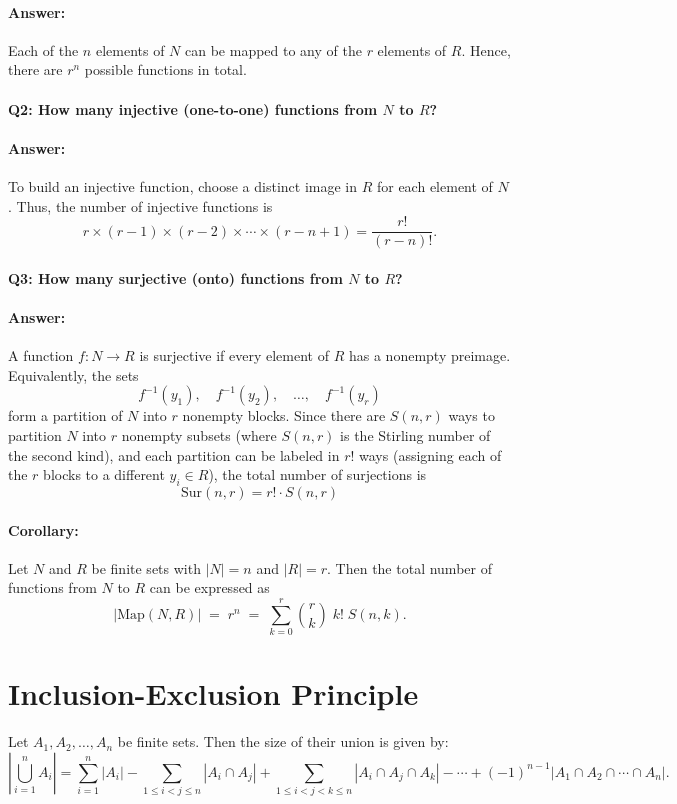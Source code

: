 \documentclass{article}
\begin{document}
\paragraph{Answer:} 
Each of the \(n\) elements of \(N\) can be mapped to any of the \(r\) elements of \(R\). Hence, there are \(r^n\) possible functions in total.

\paragraph{Q2: How many injective (one-to-one) functions from \(N\) to \(R\)?}
\paragraph{Answer:} 
To build an injective function, choose a distinct image in \(R\) for each element of \(N\). Thus, the number of injective functions is
\[
r \times (r - 1) \times (r - 2) \times \cdots \times (r - n + 1)
= \frac{r!}{(r - n)!}.
\]

\paragraph{Q3: How many surjective (onto) functions from \(N\) to \(R\)?}
\paragraph{Answer:}
A function \(f : N \to R\) is surjective if every element of \(R\) has a nonempty preimage. Equivalently, the sets 
\[
f^{-1}(y_1), \quad f^{-1}(y_2), \quad \dots, \quad f^{-1}(y_r)
\]
form a partition of \(N\) into \(r\) nonempty blocks. Since there are \(S(n,r)\) ways to partition \(N\) into \(r\) nonempty subsets (where \(S(n,r)\) is the Stirling number of the second kind), and each partition can be labeled in \(r!\) ways (assigning each of the \(r\) blocks to a different \(y_i \in R\)), the total number of surjections is
\[
\text{Sur}(n, r) = r! \cdot S(n, r)
\]

\paragraph{Corollary:}
Let \(N\) and \(R\) be finite sets with \(|N| = n\) and \(|R| = r\). Then the total number of functions from \(N\) to \(R\) can be expressed as
\[
| \mathrm{Map}(N, R) | \;=\; r^n \;=\; \sum_{k=0}^{r} \binom{r}{k} \; k! \; S(n,k).
\]




\section{Inclusion-Exclusion Principle}
Let $A_1, A_2, \dots, A_n$ be finite sets. Then the size of their union is given by:
\[
\left|\bigcup_{i=1}^n A_i\right| = \sum_{i=1}^n |A_i| - \sum_{1 \le i < j \le n} |A_i \cap A_j| + \sum_{1 \le i < j < k \le n} |A_i \cap A_j \cap A_k| - \cdots + (-1)^{n-1} |A_1 \cap A_2 \cap \cdots \cap A_n|.
\]
\end{document}
